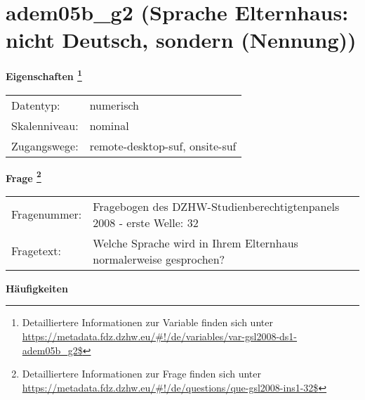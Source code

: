 
    \setcounter{footnote}{0}

    \vspace*{-1.8cm}
	\section{adem05b\_g2 (Sprache Elternhaus: nicht Deutsch, sondern (Nennung))}
	\label{section:adem05b_g2}



    \vspace*{0.5cm}
    \noindent\textbf{Eigenschaften
	\footnote{Detailliertere Informationen zur Variable finden sich unter
		\url{https://metadata.fdz.dzhw.eu/\#!/de/variables/var-gsl2008-ds1-adem05b_g2$}}}\\
	\begin{tabularx}{\hsize}{@{}lX}
	Datentyp: & numerisch \\
	Skalenniveau: & nominal \\
	Zugangswege: &
	  remote-desktop-suf, 
	  onsite-suf
 \\
    \end{tabularx}



				\vspace*{0.5cm}
                \noindent\textbf{Frage
	                \footnote{Detailliertere Informationen zur Frage finden sich unter
		              \url{https://metadata.fdz.dzhw.eu/\#!/de/questions/que-gsl2008-ins1-32$}}}\\
				\begin{tabularx}{\hsize}{@{}lX}
					Fragenummer: &
					  Fragebogen des DZHW-Studienberechtigtenpanels 2008 - erste Welle:
					  32
 \\
					Fragetext: & Welche Sprache wird in Ihrem Elternhaus normalerweise gesprochen? \\
				\end{tabularx}





        		\vspace*{0.5cm}
                \noindent\textbf{Häufigkeiten}

